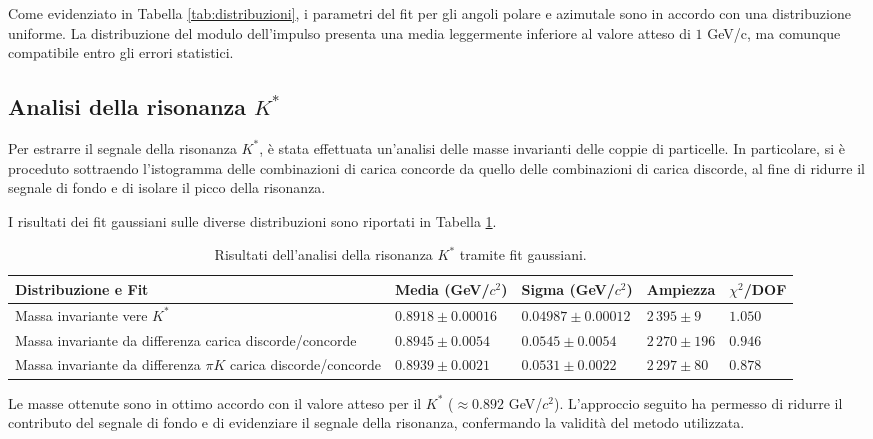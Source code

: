 \documentclass[a4paper,11pt]{article}
\begin{document}
Come evidenziato in Tabella \ref{tab:distribuzioni}, i parametri del fit per gli angoli polare e azimutale sono in accordo con una distribuzione uniforme. La distribuzione del modulo dell'impulso presenta una media leggermente inferiore al valore atteso di $1$ GeV/c, ma comunque compatibile entro gli errori statistici.

\subsection{Analisi della risonanza \( K^* \)}

Per estrarre il segnale della risonanza \( K^* \), è stata effettuata un'analisi delle masse invarianti delle coppie di particelle. In particolare, si è proceduto sottraendo l'istogramma delle combinazioni di carica concorde da quello delle combinazioni di carica discorde, al fine di ridurre il segnale di fondo e di isolare il picco della risonanza.

I risultati dei fit gaussiani sulle diverse distribuzioni sono riportati in Tabella \ref{tab:kstar}.

\begin{table}[h!]
    \centering
    \begin{tabular}{|m{2.5cm}|>{\centering\arraybackslash}m{2cm}|>{\centering\arraybackslash}m{2cm}|>{\centering\arraybackslash}m{2cm}|>{\centering\arraybackslash}m{1.5cm}|}
        \hline
        \textbf{Distribuzione e Fit} & \textbf{Media (GeV/$c^2$)} & \textbf{Sigma (GeV/$c^2$)} & \textbf{Ampiezza} & $\chi^2$/DOF \\
        \hline
        Massa invariante vere \( K^* \) & $0.8918 \pm 0.00016$ & $0.04987 \pm 0.00012$ & $2\,395 \pm 9$ & $1.050$ \\
        \hline
        Massa invariante da differenza carica discorde/concorde & $0.8945 \pm 0.0054$ & $0.0545 \pm 0.0054$ & $2\,270 \pm 196$ & $0.946$ \\
        \hline
        Massa invariante da differenza $\pi K$ carica discorde/concorde & $0.8939 \pm 0.0021$ & $0.0531 \pm 0.0022$ & $2\,297 \pm 80$ & $0.878$ \\
        \hline
    \end{tabular}
    \caption{Risultati dell'analisi della risonanza \( K^* \) tramite fit gaussiani.}
    \label{tab:kstar}
\end{table}

Le masse ottenute sono in ottimo accordo con il valore atteso per il \( K^* \) ($\approx 0.892$ GeV/$c^2$). L'approccio seguito ha permesso di ridurre il contributo del segnale di fondo e di evidenziare il segnale della risonanza, confermando la validità del metodo utilizzata.
\end{document}
